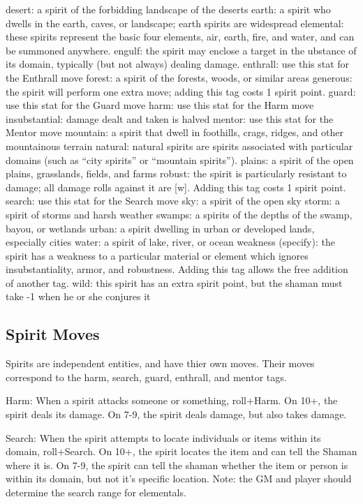desert: a spirit of the forbidding landscape of the deserts
earth: a spirit who dwells in the earth, caves, or landscape; earth spirits are widespread
elemental: these spirits represent the basic four elements, air, earth, fire, and water, and can be summoned anywhere.
engulf: the spirit may enclose a target in the ubstance of its domain, typically (but not always) dealing damage.
enthrall: use this stat for the Enthrall move
forest: a spirit of the forests, woods, or similar areas
generous: the spirit will perform one extra move; adding this tag costs 1 spirit point.
guard: use this stat for the Guard move
harm: use this stat for the Harm move
insubstantial: damage dealt and taken is halved
mentor: use this stat for the Mentor move
mountain: a spirit that dwell in foothills, crags, ridges, and other mountainous terrain
natural: natural spirits are spirits associated with particular domains (such as “city spirits” or “mountain spirits”).
plains: a spirit of the open plains, grasslands, fields, and farms
robust: the spirit is particularly resistant to damage; all damage rolls against it are [w]. Adding this tag costs 1 spirit point.
search: use this stat for the Search move
sky: a spirit of the open sky
storm: a spirit of storms and harsh weather
swamps: a spirits of the depths of the swamp, bayou, or wetlands
urban: a spirit dwelling in urban or developed lands, especially cities
water: a spirit of lake, river, or ocean
weakness (specify): the spirit has a weakness to a particular material or element which ignores insubstantiality, armor, and robustness. Adding this tag allows the free addition of another tag.
wild: this spirit has an extra spirit point, but the shaman must take -1 when he or she conjures it


\subsection{Spirit Moves}

Spirits are independent entities, and have thier own moves. Their moves correspond to the harm, search, guard, enthrall, and mentor tags.

Harm: When a spirit attacks someone or something, roll+Harm. On 10+, the spirit deals its damage. On 7-9, the spirit deals damage, but also takes damage.

Search: When the spirit attempts to locate individuals or items within its domain, roll+Search. On 10+, the spirit locates the item and can tell the Shaman where it is. On 7-9, the spirit can tell the shaman whether the item or person is within its domain, but not it’s specific location. Note: the GM and player should determine the search range for elementals.

